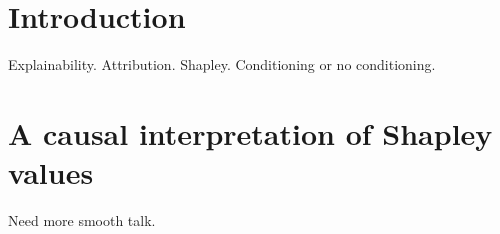 \documentclass{article}
\newcommand{\comment}[1]{{\color{red} #1}}
\begin{document}
%






%


\section{Introduction}

Explainability. Attribution. Shapley. Conditioning or no conditioning.

\section{A causal interpretation of Shapley values}

\comment{Need more smooth talk.}
\end{document}

